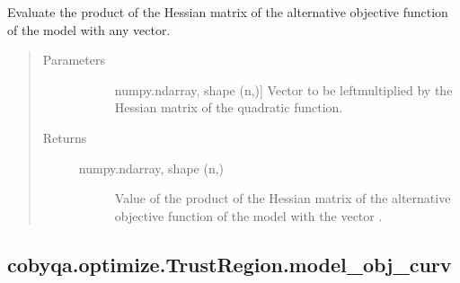\documentclass[letterpaper,10pt,english]{sphinxmanual}
\begin{document}
\begin{fulllineitems}
\begin{fulllineitems}
\label{\detokenize{refs/generated/cobyqa.optimize.TrustRegion.model_obj_alt_hessp:cobyqa.optimize.TrustRegion.model_obj_alt_hessp}}
\sphinxAtStartPar
Evaluate the product of the Hessian matrix of the alternative objective
function of the model with any vector.
\begin{quote}\begin{description}
\item[{Parameters}] \leavevmode\begin{description}
\item[{}] \leavevmode{[}numpy.ndarray, shape (n,){]}
\sphinxAtStartPar
Vector to be left\sphinxhyphen{}multiplied by the Hessian matrix of the quadratic
function.

\end{description}

\item[{Returns}] \leavevmode\begin{description}
\item[{numpy.ndarray, shape (n,)}] \leavevmode
\sphinxAtStartPar
Value of the product of the Hessian matrix of the alternative
objective function of the model with the vector .

\end{description}

\end{description}\end{quote}

\end{fulllineitems}



\subsection{cobyqa.optimize.TrustRegion.model\_obj\_curv}
\label{\detokenize{refs/generated/cobyqa.optimize.TrustRegion.model_obj_curv:cobyqa-optimize-trustregion-model-obj-curv}}\label{\detokenize{refs/generated/cobyqa.optimize.TrustRegion.model_obj_curv::doc}}


\end{fulllineitems}
\end{document}
